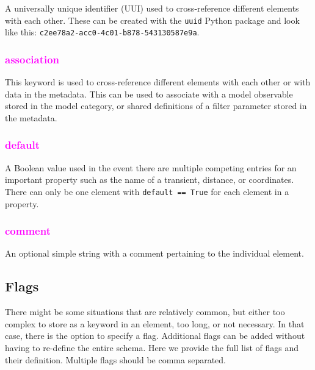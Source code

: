 \documentclass[tighten]{aastex631}
\newcommand{\keyword}[1]{\textcolor{magenta}{#1}}
\begin{document}
A universally unique identifier (UUI) used to cross-reference different elements with each other. These can be created with the {\tt uuid} Python package and look like this: {\tt c2ee78a2-acc0-4c01-b878-543130587e9a}.

\subsubsection{\keyword{association}} \label{subsec:association}

This keyword is used to cross-reference different elements with each other or with data in the metadata. This can be used to associate with a model observable stored in the model category, or shared definitions of a filter parameter stored in the metadata.



\subsubsection{\keyword{default}} \label{subsec:default}

A Boolean value used in the event there are multiple competing entries for an important property such as the name of a transient, distance, or coordinates. There can only be one element with {\tt default == True} for each element in a property.

\subsubsection{\keyword{comment}} \label{subsec:comment}

An optional simple string with a comment pertaining to the individual element.

\subsection{Flags} \label{sec:flags}

There might be some situations that are relatively common, but either too complex to store as a keyword in an element, too long, or not necessary. In that case, there is the option to specify a flag. Additional flags can be added without having to re-define the entire schema. Here we provide the full list of flags and their definition. Multiple flags should be comma separated.
\end{document}

